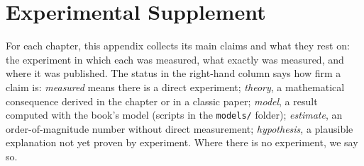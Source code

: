 \chapter{Experimental Supplement}
\label{sec:supplement}

For each chapter, this appendix collects its main claims and what they rest on: the experiment in which each was measured, what exactly was measured, and where it was published. The status in the right-hand column says how firm a claim is: \emph{measured} means there is a direct experiment; \emph{theory}, a mathematical consequence derived in the chapter or in a classic paper; \emph{model}, a result computed with the book's model (scripts in the \texttt{models/} folder); \emph{estimate}, an order-of-magnitude number without direct measurement; \emph{hypothesis}, a plausible explanation not yet proven by experiment. Where there is no experiment, we say so.























